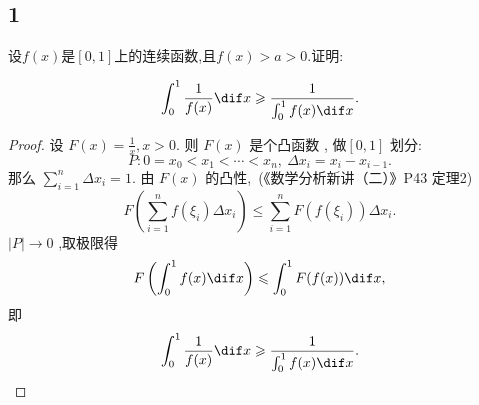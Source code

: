 \subsection{1}

设$f(x)$是$[0,1]$上的连续函数,且$f(x)>a>0$.证明:

\begin{equation}
	\int^1_0 \frac{1}{f(x)} \dif x \geqslant \frac{1}{\int ^1_0 f(x) \dif x}.
\end{equation}


\begin{proof}
	设 $F(x)=\frac{1}{x}, x>0 .$ 则 $F(x)$ 是个凸函数
, 做$[0,1]$ 划分:
\begin{equation}
	P: 0=x_{0}<x_{1}<\cdots<x_{n},\ \Delta x_{i}=x_{i}-x_{i-1}.
\end{equation}
那么 $\sum_{i=1}^{n} \Delta x_{i}=1$.
由 $F(x)$ 的凸性,\ (《数学分析新讲（二）》P43 定理2)
\begin{equation}
	F\left(\sum_{i=1}^{n} f\left(\xi_{i}\right) \Delta x_{i}\right) \leqslant \sum_{i=1}^{n} F\left(f\left(\xi_{i}\right)\right) \Delta x_{i}.
\end{equation}
$|P| \rightarrow 0$ ,取极限得
\begin{equation}
	F\left(\int_{0}^{1} f(x) \dif x\right) \leqslant \int_{0}^{1} F(f(x)) \dif x,
\end{equation}
即
\begin{equation}
	\int^1_0 \frac{1}{f(x)} \dif x \geqslant \frac{1}{\int ^1_0 f(x) \dif x}.
\end{equation}
\end{proof}